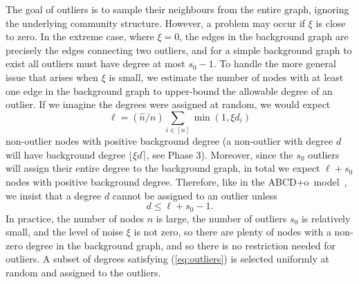\documentclass[review,los,12pt]{ryethesis}
\newcommand{\abcdo}{{ABCD+o}}
\begin{document}
The goal of outliers is to sample their neighbours from the entire graph, ignoring the underlying community structure.
However, a problem may occur if $\xi$ is close to zero.
In the extreme case, where $\xi=0$, the edges in the background graph are precisely the edges connecting two outliers, and for a simple background graph to exist all outliers must have degree at most $s_0 - 1$.
To handle the more general issue that arises when $\xi$ is small, we estimate the number of nodes with at least one edge in the background graph to upper-bound the allowable degree of an outlier.
If we imagine the degrees were assigned at random, we would expect
\begin{equation}
  \ell = (\hat{n} / n) \sum_{i\in [n]}\min(1, \xi d_i)
\end{equation}
non-outlier nodes with positive background degree (a non-outlier with degree $d$ will have background degree $\lfloor \xi d \rceil$, see Phase 3).
Moreover, since the $s_0$ outliers will assign their entire degree to the background graph, in total we expect $\ell + s_0$ nodes with positive background degree.
Therefore, like in the \abcdo\ model~\cite{abcdo}, we insist that a degree $d$ cannot be assigned to an outlier unless
\begin{equation}\label{eq:outliers}
d \le \ell + s_0 - 1.
\end{equation}
In practice, the number of nodes $n$ is large, the number of outliers $s_0$ is relatively small, and the level of noise $\xi$ is not zero, so there are plenty of nodes with a non-zero degree in the background graph, and so there is no restriction needed for outliers.
A subset of  degrees satisfying (\ref{eq:outliers}) is selected uniformly at random and assigned to the outliers.
\end{document}
